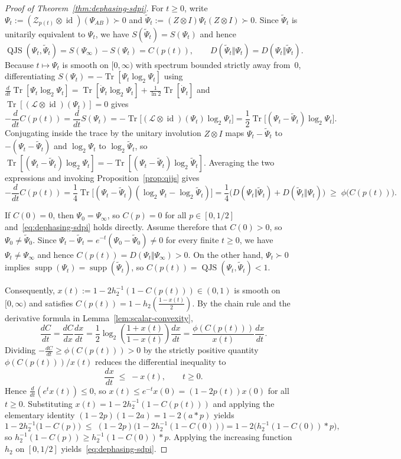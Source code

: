 \documentclass[10pt,a4paper]{article}
\numberwithin{equation}{section}
\theoremstyle{plain}
\theoremstyle{definition}
\theoremstyle{remark}
\DeclareMathOperator{\Tr}{Tr}
\DeclareMathOperator{\supp}{supp}
\DeclareMathOperator{\QJS}{QJS}
\DeclareMathOperator{\id}{id}
\newcommand{\cZ}{\mathcal{Z}}
\newcommand{\cL}{\mathcal{L}}
\begin{document}
\begin{proof}[Proof of Theorem~\ref{thm:dephasing-sdpi}]
For $t \ge 0$, write $\Psi_t := (\cZ_{p(t)} \otimes \id)(\Psi_{AB}) \succ 0$ and $\widetilde{\Psi}_t := (Z \otimes I)\Psi_t(Z \otimes I) \succ 0$. Since $\widetilde{\Psi}_t$ is unitarily equivalent to $\Psi_t$, we have $S(\widetilde{\Psi}_t) = S(\Psi_t)$ and hence
\[
\QJS(\Psi_t, \widetilde{\Psi}_t) = S(\Psi_\infty) - S(\Psi_t) = C(p(t)), \qquad
D(\widetilde{\Psi}_t \Vert \Psi_t) = D(\Psi_t \Vert \widetilde{\Psi}_t).
\]
Because $t \mapsto \Psi_t$ is smooth on $[0,\infty)$ with spectrum bounded strictly away from~$0$, differentiating $S(\Psi_t) = -\Tr[\Psi_t \log_2 \Psi_t]$ using $\frac{d}{dt}\Tr[\Psi_t \log_2 \Psi_t] = \Tr[\dot{\Psi}_t \log_2 \Psi_t] + \frac{1}{\ln 2}\Tr[\dot{\Psi}_t]$ and $\Tr[(\cL \otimes \id)(\Psi_t)] = 0$ gives
\[
-\frac{d}{dt} C(p(t)) = \frac{d}{dt} S(\Psi_t) = -\Tr\!\bigl[(\cL \otimes \id)(\Psi_t)\log_2 \Psi_t\bigr] = \frac{1}{2}\Tr\!\bigl[(\Psi_t - \widetilde{\Psi}_t)\log_2 \Psi_t\bigr].
\]
Conjugating inside the trace by the unitary involution $Z \otimes I$ maps $\Psi_t - \widetilde{\Psi}_t$ to $-(\Psi_t - \widetilde{\Psi}_t)$ and $\log_2 \Psi_t$ to $\log_2 \widetilde{\Psi}_t$, so $\Tr[(\Psi_t - \widetilde{\Psi}_t)\log_2 \Psi_t] = -\Tr[(\Psi_t - \widetilde{\Psi}_t)\log_2 \widetilde{\Psi}_t]$. Averaging the two expressions and invoking Proposition~\ref{prop:qjjs} gives
\[
-\frac{d}{dt} C(p(t)) = \frac{1}{4}\Tr\!\bigl[(\Psi_t - \widetilde{\Psi}_t)(\log_2 \Psi_t - \log_2 \widetilde{\Psi}_t)\bigr] = \frac{1}{4}\bigl(D(\Psi_t \Vert \widetilde{\Psi}_t) + D(\widetilde{\Psi}_t \Vert \Psi_t)\bigr) \;\ge\; \phi\bigl(C(p(t))\bigr).
\]

If $C(0) = 0$, then $\Psi_0 = \Psi_\infty$, so $C(p) = 0$ for all $p \in [0, 1/2]$ and~\eqref{eq:dephasing-sdpi} holds directly. Assume therefore that $C(0) > 0$, so $\Psi_0 \ne \widetilde{\Psi}_0$. Since $\Psi_t - \widetilde{\Psi}_t = e^{-t}(\Psi_0 - \widetilde{\Psi}_0) \ne 0$ for every finite $t \ge 0$, we have $\Psi_t \ne \Psi_\infty$ and hence $C(p(t)) = D(\Psi_t \Vert \Psi_\infty) > 0$. On the other hand, $\Psi_t \succ 0$ implies $\supp(\Psi_t) = \supp(\widetilde{\Psi}_t)$, so $C(p(t)) = \QJS(\Psi_t, \widetilde{\Psi}_t) < 1$.

Consequently, $x(t) := 1 - 2h_2^{-1}(1 - C(p(t))) \in (0,1)$ is smooth on $[0,\infty)$ and satisfies $C(p(t)) = 1 - h_2(\frac{1 - x(t)}{2})$. By the chain rule and the derivative formula in Lemma~\ref{lem:scalar-convexity},
\[
\frac{dC}{dt} = \frac{dC}{dx}\frac{dx}{dt} = \frac{1}{2}\log_2\!\left(\frac{1 + x(t)}{1 - x(t)}\right)\frac{dx}{dt} = \frac{\phi(C(p(t)))}{x(t)}\frac{dx}{dt}.
\]
Dividing $-\frac{dC}{dt} \ge \phi(C(p(t))) > 0$ by the strictly positive quantity $\phi(C(p(t)))/x(t)$ reduces the differential inequality to
\[
\frac{dx}{dt} \;\le\; -x(t), \qquad t \ge 0.
\]
Hence $\frac{d}{dt}(e^t x(t)) \le 0$, so $x(t) \le e^{-t} x(0) = (1 - 2p(t)) x(0)$ for all $t \ge 0$. Substituting $x(t) = 1 - 2h_2^{-1}(1 - C(p(t)))$ and applying the elementary identity $(1 - 2p)(1 - 2a) = 1 - 2(a * p)$ yields
\[
1 - 2h_2^{-1}\bigl(1 - C(p)\bigr) \;\le\; (1 - 2p)\bigl(1 - 2h_2^{-1}(1 - C(0))\bigr) = 1 - 2\bigl(h_2^{-1}(1 - C(0)) * p\bigr),
\]
so $h_2^{-1}(1 - C(p)) \ge h_2^{-1}(1 - C(0)) * p$. Applying the increasing function $h_2$ on $[0, 1/2]$ yields~\eqref{eq:dephasing-sdpi}.


\end{proof}
\end{document}
